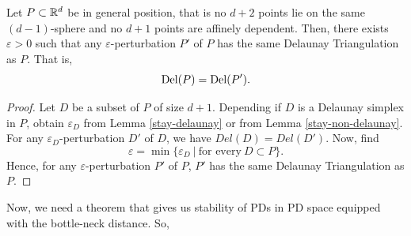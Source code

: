 \documentclass[letterpaper,titlepage]{article}
\begin{document}
    
    
    \begin{thm}
        Let $P \subset \mathbb{R}^d$ be in general position, that is no $d+2$ points lie on the same $(d-1)$-sphere and no $d+1$ points are affinely dependent. Then, there exists $\varepsilon>0$ such that any $\varepsilon$-perturbation $P'$ of $P$ has the same Delaunay Triangulation as $P$. That is,
        $$\text{Del}(P) = \text{Del}(P').$$
    \end{thm}
    \begin{proof}
        Let $D$ be a subset of $P$ of size $d+1$. Depending if $D$ is a Delaunay simplex in $P$, obtain $\varepsilon_D$ from Lemma \ref{stay-delaunay} or from Lemma \ref{stay-non-delaunay}. For any $\varepsilon_D$-perturbation $D'$ of $D$, we have $Del(D)=Del(D')$. Now, find
        $$\varepsilon = \min \{\varepsilon_D\ |\ \text{for every}\ D \subset P\}.$$
        Hence, for any $\varepsilon$-perturbation $P'$ of $P$, $P'$ has the same Delaunay Triangulation as $P$.
    \end{proof}
    
    Now, we need a theorem that gives us stability of PDs in PD space equipped with the bottle-neck distance. So,
\end{document}
